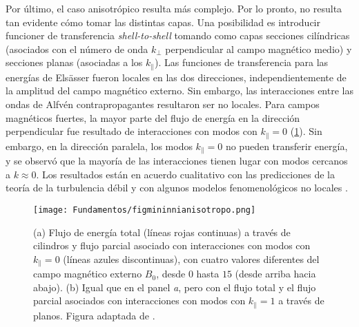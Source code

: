 Por último, el caso anisotrópico resulta más complejo. Por lo pronto,
no resulta tan evidente cómo tomar las distintas capas. Una
posibilidad es introducir funcioner de transferencia
\textit{shell-to-shell} tomando como capas secciones cilíndricas
(asociados con el número de onda $k_\perp$ perpendicular al campo
magnético medio) y secciones planas (asociadas a los
$k_\parallel$). Las funciones de transferencia para las energías de
Els\"asser fueron locales en las dos direcciones, independientemente
de la amplitud del campo magnético externo. Sin embargo, las
interacciones entre las ondas de Alfv\'en contrapropagantes resultaron
ser no locales. Para campos magnéticos fuertes, la mayor parte del
flujo de energía en la dirección perpendicular fue resultado de
interacciones con modos con $k_\parallel = 0$
(\cref{fig:mininnianisotropo}). Sin embargo, en la dirección
paralela, los modos $k_\parallel = 0$ no pueden transferir energía, y
se observó que la mayoría de las interacciones tienen lugar con modos
cercanos a $k \approx 0$. Los resultados están en acuerdo cualitativo
con las predicciones de la teoría de la turbulencia débil
\cite{galtier_weak_2000} y con algunos modelos fenomenológicos no
locales \cite{alexakis_nonlocal_2007}.
\begin{figure}[h!]
  \centering
  \texttt{[image: Fundamentos/figmininnianisotropo.png]}
  \caption{(a) Flujo de energía total (líneas rojas continuas) a
    través de cilindros y flujo parcial asociado con interacciones con
    modos con $k_\parallel = 0$ (líneas azules discontinuas), con
    cuatro valores diferentes del campo magnético externo $B_0$, desde
    $0$ hasta $15$ (desde arriba hacia abajo). (b) Igual que en el
    panel \emph{a}, pero con el flujo total y el flujo parcial
    asociados con interacciones con modos con $k_\parallel = 1$ a
    través de planos. Figura adaptada de
    \cite{alexakis_anisotropic_2007}.}
  \label{fig:mininnianisotropo}
\end{figure}

